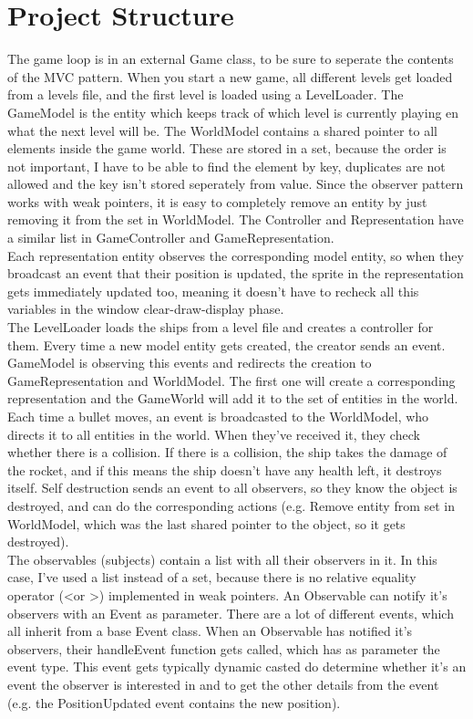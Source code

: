 \documentclass{article}
\begin{document}
	\section{Project Structure}
	The game loop is in an external Game class, to be sure to seperate the contents of the MVC pattern. When you start a new game, all different levels get loaded from a levels file, and the first level is loaded using a LevelLoader. The GameModel is the entity which keeps track of which level is currently playing en what the next level will be. The WorldModel contains a shared pointer to all elements inside the game world. These are stored in a set, because the order is not important, I have to be able to find the element by key, duplicates are not allowed and the key isn't stored seperately from value. Since the observer pattern works with weak pointers, it is easy to completely remove an entity by just removing it from the set in WorldModel. The Controller and Representation have a similar list in GameController and GameRepresentation. \\
	Each representation entity observes the corresponding model entity, so when they broadcast an event that their position is updated, the sprite in the representation gets immediately updated too, meaning it doesn't have to recheck all this variables in the window clear-draw-display phase. \\
	The LevelLoader loads the ships from a level file and creates a controller for them. Every time a new model entity gets created, the creator sends an event. GameModel is observing this events and redirects the creation to GameRepresentation and WorldModel. The first one will create a corresponding representation and the GameWorld will add it to the set of entities in the world. \\
	Each time a bullet moves, an event is broadcasted to the WorldModel, who directs it to all entities in the world. When they've received it, they check whether there is a collision. If there is a collision, the ship takes the damage of the rocket, and if this means the ship doesn't have any health left, it destroys itself. Self destruction sends an event to all observers, so they know the object is destroyed, and can do the corresponding actions (e.g. Remove entity from set in WorldModel, which was the last shared pointer to the object, so it gets destroyed). \\
	The observables (subjects) contain a list with all their observers in it. In this case, I've used a list instead of a set, because there is no relative equality operator (\textless or \textgreater) implemented in weak pointers. An Observable can notify it's observers with an Event as parameter. There are a lot of different events, which all inherit from a base Event class. When an Observable has notified it's observers, their handleEvent function gets called, which has as parameter the event type. This event gets typically dynamic casted do determine whether it's an event the observer is interested in and to get the other details from the event (e.g. the PositionUpdated event contains the new position). \\
\end{document}
